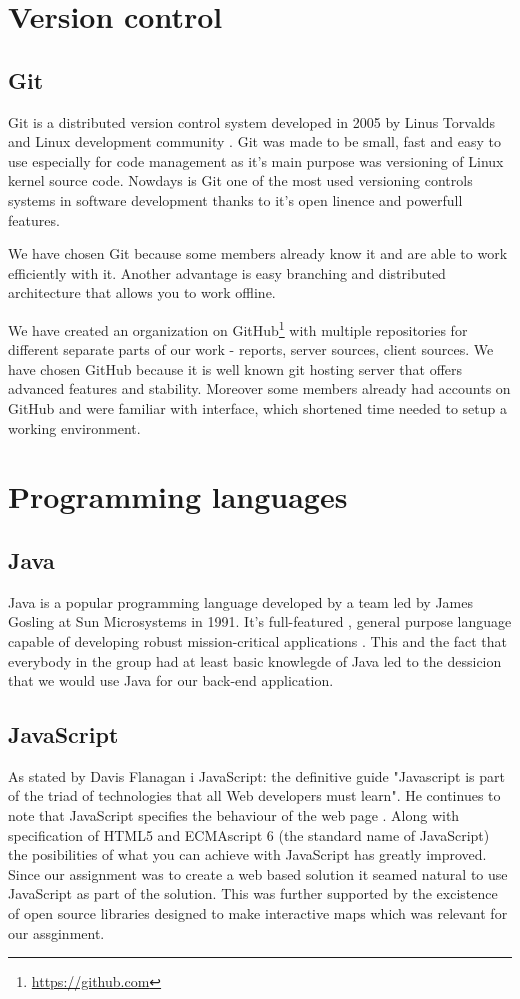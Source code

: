 \documentclass[11pt,a4paper,titlepage,oneside]{report}
\begin{document}
\section{Version control}
  \subsection{Git}
  Git is a distributed version control system developed in 2005 by Linus Torvalds and Linux development community \cite{ProGit}. Git was made to be small, fast and easy to use especially for code management as it's main purpose was versioning of Linux kernel source code. Nowdays is Git one of the most used versioning controls systems in software development thanks to it's open linence and powerfull features.

  We have chosen Git because some members already know it and are able to work efficiently with it. Another advantage is easy branching and distributed architecture that allows you to work offline. 
  
  We have created an organization on GitHub\footnote{\url{https://github.com}} with multiple repositories for different separate parts of our work - reports, server sources, client sources. We have chosen GitHub because it is well known git hosting server that offers advanced features and stability. Moreover some members already had accounts on GitHub and were familiar with interface, which shortened time needed to setup a working environment.

\section{Programming languages}
  \subsection{Java}
  Java is a popular programming language developed by a team led by James Gosling at Sun Microsystems in 1991. It's full-featured , general purpose language capable of developing robust mission-critical applications \cite{liang}. This and the fact that everybody in the group had at least basic knowlegde of Java led to the dessicion that we would use Java for our back-end application.  
  \subsection{JavaScript}
  As stated by Davis Flanagan i JavaScript: the definitive guide "Javascript is part of the triad of technologies that all Web developers must learn". He continues to note that JavaScript specifies the behaviour of the web page \cite{fd11}. Along with specification of HTML5 and ECMAscript 6 (the standard name of JavaScript) the posibilities of what you can achieve with JavaScript has greatly improved. Since our assignment was to create a web based solution it seamed natural to use JavaScript as part of the solution. This was further supported by the excistence of open source libraries designed to make interactive maps which was relevant for our assginment.
\end{document}

